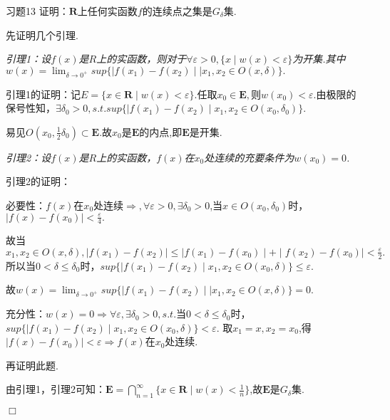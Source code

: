 \documentclass[11pt, a4paper, twoside]{ctexbook}
\newenvironment{proof2}{{\noindent\heiti 证明}}{\hfill $\Box $\par}
\begin{document}
	\begin{myproposition}{习题13}{}
		证明：$\mathbf{R}$上任何实函数$f$的连续点之集是$G_{\delta }$集.
	\end{myproposition}
	\begin{proof2}
		先证明几个引理.

		\textsl{引理1：设$f(x)$是$R$上的实函数，则对于$\forall \varepsilon>0,\{x\mid w(x)<\varepsilon\}$为开集.其中$w(x)=\displaystyle\lim_{\delta\to 0^{+}} sup \{\mid f(x_{1})-f(x_{2})\mid \mid x_{1},x_{2}\in O(x,\delta)\}.$ }
	
		引理1的证明：记$E=\{x\in\mathbf{R}\mid w(x)<\varepsilon\}.$任取$x_{0}\in\mathbf{E},$则$w(x_{0})<\varepsilon$.由极限的保号性知，$\exists \delta_{0}>0,s.t.sup\{\mid f(x_{1})-f(x_{2})\mid x_{1},x_{2}\in O(x_{0},\delta_{0})\}$.

		易见$O(x_{0},\displaystyle\frac{1}{2}\delta_{0})\subset \mathbf{E}$.故$x_{0}$是$\mathbf{E}$的内点,即$\mathbf{E}$是开集.

		\textsl{引理2：设$f(x)$是$R$上的实函数，$f(x)$在$x_{0}$处连续的充要条件为$w(x_{0})=0$.}

		引理2的证明：
		
		必要性：$f(x)$在$x_{0}$处连续$\Rightarrow,\forall \varepsilon>0,\exists \delta_{0}>0$,当$x\in O(x_{0},\delta_{0})$时，$\mid f(x)-f(x_{0})\mid<\displaystyle\frac{\varepsilon}{4}.$

		故当 $x_{1},x_{2}\in O(x,\delta),\mid f(x_{1})-f(x_{2})\mid \leq \mid f(x_{1})-f(x_{0})\mid + \mid f(x_{2})-f(x_{0})\mid < \displaystyle\frac{\varepsilon}{2}.$
		所以当$0<\delta\leq \delta_{0}$时，$sup\{\mid f(x_{1})-f(x_{2})\mid x_{1},x_{2}\in O(x_{0},\delta)\}\leq \varepsilon.$

		故$w(x)=\displaystyle\lim_{\delta\to 0^{+}}sup\{\mid f(x_{1})-f(x_{2})\mid \mid x_{1},x_{2}\in O(x,\delta)\}=0.$ 
	
		充分性：$w(x)=0 \Rightarrow \forall \varepsilon,\exists \delta_{0}>0,s.t.$当$0<\delta\leq\delta_{0}$时，$sup\{\mid f(x_{1})-f(x_{2})\mid x_{1},x_{2}\in O(x_{0},\delta)\}< \varepsilon.$
		取$x_{1}=x,x_{2}=x_{0}$,得$\mid f(x)-f(x_{0})\mid<\varepsilon \Rightarrow f(x)$在$x_{0}$处连续.
		
		再证明此题.

		由引理1，引理2可知：$\mathbf{E}=\displaystyle\bigcap_{n=1}^{\infty}\{x\in\mathbf{R}\mid w(x)<\displaystyle\frac{1}{n}\}$,故$\mathbf{E}$是$G_{\delta }$集.

	\end{proof2}
\end{document}
